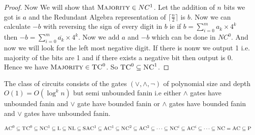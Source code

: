 \begin{proof}
	
	
	Now We will show that $\textsc{Majority}\in NC^1$. Let the addition of $n$ bits we got is $a$ and the Redundant Algebra representation of $\lceil\frac{n}2\rceil$ is $b$. Now we can calculate $-b$ with reversing the sign of every digit in $b$ ie if $b=\sum\limits_{i=0}^{m}a_k\times 4^k$ then $-b=\sum\limits_{i=0}^m\overline{a_k}\times 4^k$. Now we add $a$ and $-b$ which can be done in $NC^0$. And now we will look for the left most negative digit. If there is nonw we output 1 i.e. majority of the bits are 1 and if there exists a negative bit then output is 0. Hence we have $\textsc{Majority}\in \textsc{TC}^0$. So $\textsc{TC}^0\subseteq \textsc{NC}^1$.
\end{proof}

\begin{definition}
	The class of circuits consists of the gates $(\vee,\wedge,\neg)$  of polynomial size and depth $O(1)=O(\log^k n)$ but semi unbounded fanin i.e either $\wedge$ gates have unbounded fanin and $\vee$ gate have bounded fanin or $\wedge$ gates have bounded fanin and $\vee$ gates have unbounded fanin.
\end{definition}
\begin{theorem}
	$\textsc{AC}^0\subseteq \textsc{TC}^0\subseteq \textsc{NC}^1\subseteq \textsc{L}\subseteq \textsc{\textsc{NL}}\subseteq  \textsc{SAC}^1\subseteq \textsc{AC}^1\subseteq \textsc{NC}^2\subseteq \textsc{AC}^2\subseteq \cdots \subseteq \textsc{NC}^i\subseteq \textsc{AC}^i\subseteq \cdots \subseteq \textsc{NC}=\textsc{AC}\subseteq \textsc{P}$
\end{theorem}
